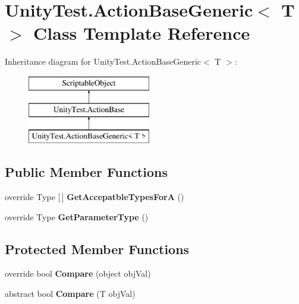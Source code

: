 \hypertarget{class_unity_test_1_1_action_base_generic}{}\section{Unity\+Test.\+Action\+Base\+Generic$<$ T $>$ Class Template Reference}
\label{class_unity_test_1_1_action_base_generic}
Inheritance diagram for Unity\+Test.\+Action\+Base\+Generic$<$ T $>$\+:\begin{figure}[H]
\begin{center}
\leavevmode
\includegraphics[height=3.000000cm]{class_unity_test_1_1_action_base_generic}
\end{center}
\end{figure}
\subsection*{Public Member Functions}
\begin{DoxyCompactItemize}
\item 
\mbox{\label{class_unity_test_1_1_action_base_generic_a46dc8b23ef79ba312baae7e1640268a0}} 
override Type \mbox{[}$\,$\mbox{]} {\bfseries Get\+Accepatble\+Types\+ForA} ()
\item 
\mbox{\label{class_unity_test_1_1_action_base_generic_a367102494eda9f36a6585ba29c2d26e7}} 
override Type {\bfseries Get\+Parameter\+Type} ()
\end{DoxyCompactItemize}
\subsection*{Protected Member Functions}
\begin{DoxyCompactItemize}
\item 
\mbox{\label{class_unity_test_1_1_action_base_generic_aeb048d473aa6eb969dd8546d2b31dcf1}} 
override bool {\bfseries Compare} (object obj\+Val)
\item 
\mbox{\label{class_unity_test_1_1_action_base_generic_afe5bcd1a255561c3bb55091bb76d637f}} 
abstract bool {\bfseries Compare} (T obj\+Val)
\end{DoxyCompactItemize}
